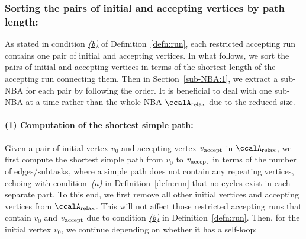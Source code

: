 \documentclass[Afour,sageh,times]{sagej}
\newcommand{\auto}[1]{\ccalA_{\textup{#1}}}
\newcommand{\vertex}[1]{v_{\textup{#1}}}
\begin{document}
{%

  \subsubsection{Sorting the pairs of initial and accepting vertices by path length:}\label{sec:sort}  As stated in condition \hyperref[cond:b]{\it (b)} of Definition~\ref{defn:run}, each restricted accepting run  contains  one pair of initial and accepting vertices. In what follows, we sort the pairs of initial and accepting vertices in terms of the shortest length of the accepting run connecting them.  Then in Section~\ref{sub-NBA:1}, we extract a sub-NBA for each pair by following the order. It is beneficial to deal with one sub-NBA at a time  rather than the whole NBA $\auto{relax}$ due to the reduced size.

  \paragraph{(1) Computation of the shortest simple path:} Given a pair of initial vertex $v_0$ and accepting vertex $\vertex{accept}$ in $\auto{relax}$, we first compute  the shortest simple path from  $v_0$ to $\vertex{accept}$ in terms of the number of edges/subtasks,  where a simple path does not contain any  repeating vertices, echoing with condition~\hyperref[cond:a]{\it (a)} in Definition~\ref{defn:run} that no cycles exist in each separate part.
  To this end, we first remove all other initial vertices and accepting vertices from $\auto{relax}$. This will not affect those restricted  accepting runs that contain $v_0$ and $\vertex{accept}$ due to condition \hyperref[cond:b]{\it (b)}  in Definition~\ref{defn:run}.  Then, for the initial vertex $v_0$, we continue depending on whether it has a self-loop:

}
\end{document}
